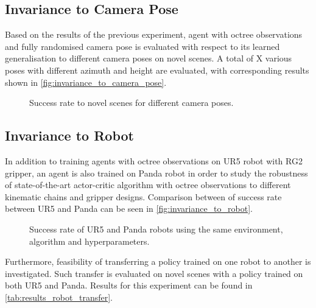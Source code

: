 \subsection{Invariance to Camera Pose}

Based on the results of the previous experiment, agent with octree observations and fully randomised camera pose is evaluated with respect to its learned generalisation to different camera poses on novel scenes. A total of X various poses with different azimuth and height are evaluated, with corresponding results shown in \autoref{fig:invariance_to_camera_pose}.

\begin{figure}[ht]
    \centering
    \caption{Success rate to novel scenes for different camera poses.}
    \label{fig:invariance_to_camera_pose}
\end{figure}


\subsection{Invariance to Robot}

In addition to training agents with octree observations on UR5 robot with RG2 gripper, an agent is also trained on Panda robot in order to study the robustness of state-of-the-art actor-critic algorithm with octree observations to different kinematic chains and gripper designs. Comparison between of success rate between UR5 and Panda can be seen in \autoref{fig:invariance_to_robot}.

\begin{figure}[ht]
    \centering
    \caption{Success rate of UR5 and Panda robots using the same environment, algorithm and hyperparameters.}
    \label{fig:invariance_to_robot}
\end{figure}

Furthermore, feasibility of transferring a policy trained on one robot to another is investigated. Such transfer is evaluated on novel scenes with a policy trained on both UR5 and Panda. Results for this experiment can be found in \autoref{tab:results_robot_transfer}.

